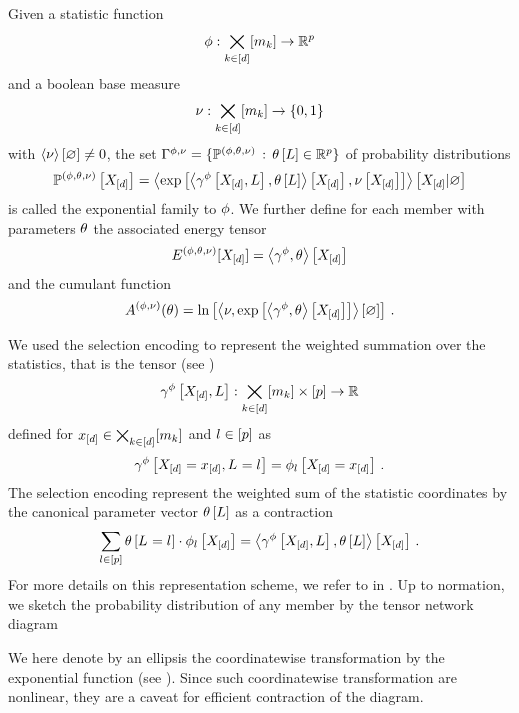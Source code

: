 \begin{definition}
    \label{def:expFamily}
    Given a statistic function
    \begin{align*}
        \phi : \bigtimes_{k\in[d]}[m_{k}] \rightarrow \mathbb{R}^{p}
    \end{align*}
    and a boolean base measure
    \begin{align*}
        \nu : \bigtimes_{k\in[d]}[m_{k}] \rightarrow \{0,1\}
    \end{align*}
    with $\left\langle \nu\right\rangle \left[ \varnothing \right]\neq0$, the set $\Gamma^{\phi,\nu}=\{\mathbb{P}^{(\phi,\theta,\nu)} \, : \, \theta\left[L\right]\in\mathbb{R}^{p}\}$ of probability distributions
    \begin{align*}
        \mathbb{P}^{(\phi,\theta,\nu)}\left[X_{[d]}\right] = \left\langle \mathrm{exp}\left[\left\langle \gamma^{\phi}\left[X_{[d]},L\right],\theta\left[L\right]\right\rangle \left[ X_{[d]} \right],\nu\left[X_{[d]}\right]\right]\right\rangle \left[ X_{[d]} | \varnothing \right]
    \end{align*}
    is called the exponential family to $\phi$.
    We further define for each member with parameters $\theta$ the associated energy tensor
    \begin{align*}
        E^{(\phi,\theta,\nu)}[X_{[d]}] = \left\langle \gamma^{\phi},\theta\right\rangle \left[ X_{[d]} \right]
    \end{align*}
    and the cumulant function
    \[ A^{(\phi,\nu)}(\theta) = \ln \left[ \left\langle \nu,\mathrm{exp}\left[\left\langle \gamma^{\phi},\theta\right\rangle \left[ X_{[d]} \right] \right]\right\rangle \left[ \varnothing \right]  \right] \, .\]
\end{definition}


We used the selection encoding to represent the weighted summation over the statistics, that is the tensor (see )
\begin{align*}
    \gamma^{\phi}\left[X_{[d]},L\right]: \bigtimes_{k\in[d]}[m_{k}] \times [p] \rightarrow \mathbb{R}
\end{align*}
defined for $x_{[d]}\in\bigtimes_{k\in[d]}[m_{k}]$ and $l\in[p]$ as
\begin{align*}
    \gamma^{\phi}\left[X_{[d]}=x_{[d]},L_{}=l_{}\right] = \phi_{l}\left[X_{[d]}=x_{[d]}\right] \, .
\end{align*}
The selection encoding represent the weighted sum of the statistic coordinates by the canonical parameter vector $\theta\left[L\right]$ as a contraction
\begin{align*}
    \sum_{l\in[p]}\theta\left[L_{}=l_{}\right]\cdot \phi_{l}\left[X_{[d]}\right]
    = \left\langle \gamma^{\phi}\left[X_{[d]},L\right],\theta\left[L\right]\right\rangle \left[ X_{[d]} \right] \, .
\end{align*}
For more details on this representation scheme, we refer to  in .
Up to normation, we sketch the probability distribution of any member by the tensor network diagram
\begin{center}
    
\end{center}
We here denote by an ellipsis the coordinatewise transformation by the exponential function (see ).
Since such coordinatewise transformation are nonlinear, they are a caveat for efficient contraction of the diagram.

